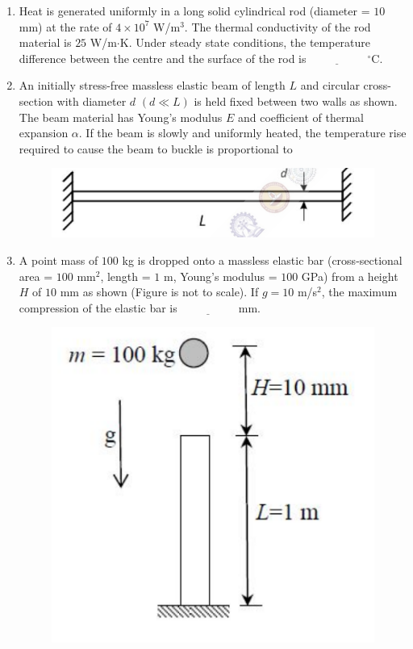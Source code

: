 \documentclass[journal]{IEEEtran}
\begin{document}
\begin{enumerate}[leftmargin=0pt]
    \item Heat is generated uniformly in a long solid cylindrical rod (diameter = $10$ mm) at the rate of $4 \times 10^7$ W/m$^3$. The thermal conductivity of the rod material is $25$ W/m$\cdot$K. Under steady state conditions, the temperature difference between the centre and the surface of the rod is $\underline{\hspace{2cm}}$ $^\circ$C.
    \hfill{}

    \item An initially stress-free massless elastic beam of length $L$ and circular cross-section with diameter $d$ $(d \ll L)$ is held fixed between two walls as shown. The beam material has Young's modulus $E$ and coefficient of thermal expansion $\alpha$. If the beam is slowly and uniformly heated, the temperature rise required to cause the beam to buckle is proportional to
    \hfill{}
    \begin{figure}[h]
    \centering
    \includegraphics[width=0.5\columnwidth]{Figs/image (25).png}
    \caption*{}
    \label{fig:39}
    \end{figure}
    \newpage
    \begin{enumerate}
    \end{enumerate}

    \item A point mass of $100$ kg is dropped onto a massless elastic bar (cross-sectional area = $100$ mm$^2$, length = $1$ m, Young's modulus = $100$ GPa) from a height $H$ of $10$ mm as shown (Figure is not to scale). If $g = 10$ m/s$^2$, the maximum compression of the elastic bar is $\underline{\hspace{2cm}}$ mm.
    \hfill{}
   \begin{figure}[h]
    \centering
    \includegraphics[width=0.5\columnwidth]{Figs/image (26).png}
    \caption*{}
    \label{fig:40}
    \end{figure} 


\end{enumerate}
\end{document}
